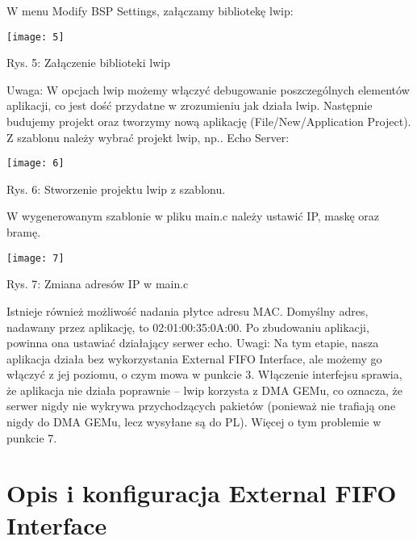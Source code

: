 \documentclass[11pt, letterpaper]{article}
\begin{document}
\vspace{2mm}
W menu Modify BSP Settings, załączamy bibliotekę lwip:
\vspace{2mm}

\texttt{[image: 5]}
\begin{center}
\caption{Rys. 5: Załączenie biblioteki lwip}
\end{center}
Uwaga:
W opcjach lwip możemy włączyć debugowanie poszczególnych elementów aplikacji, co jest dość przydatne w zrozumieniu jak działa lwip.
Następnie budujemy projekt oraz tworzymy nową aplikację (File/New/Application Project). Z szablonu należy wybrać projekt lwip, np.. Echo Server:

\vspace{5mm}
\texttt{[image: 6]}
\begin{center}
\caption{Rys. 6: Stworzenie projektu lwip z szablonu.}
\end{center}

\vspace{5mm}
W wygenerowanym szablonie w pliku main.c należy ustawić IP, maskę oraz bramę.
\vspace{5mm}

\texttt{[image: 7]}
\begin{center}
\caption{Rys. 7: Zmiana adresów IP w main.c}
\end{center}
\vspace{2mm}

Istnieje również możliwość nadania płytce adresu MAC. Domyślny adres, nadawany przez aplikację, to 02:01:00:35:0A:00.
Po zbudowaniu aplikacji, powinna ona ustawiać działający serwer echo.
Uwagi:
Na tym etapie, nasza aplikacja działa bez wykorzystania External FIFO Interface, ale możemy go włączyć z jej poziomu, o czym mowa w punkcie 3.
Włączenie interfejsu sprawia, że aplikacja nie działa poprawnie – lwip korzysta z DMA GEMu, co oznacza, że serwer nigdy nie wykrywa przychodzących pakietów (ponieważ nie trafiają one nigdy do DMA GEMu, lecz wysyłane są do PL).
Więcej o tym problemie w punkcie 7.

\section{Opis i konfiguracja External FIFO Interface}
\end{document}
